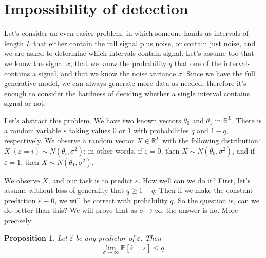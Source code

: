 \documentclass{article}
\newtheorem{prop}[thm]{Proposition}
\theoremstyle{thm}
\theoremstyle{definition}
\newcommand{\R}{\mathbb{R}}
\newcommand{\ep}{\varepsilon}
\newcommand{\1}{\mathbf{1}}
\renewcommand{\P}{\mathbb{P}}
\begin{document}






\section{Impossibility of detection}

Let's consider an even easier problem, in which someone hands us intervals of length $L$ that either contain the full signal plus noise, or contain just noise, and we are asked to determine which intervals contain signal. Let's assume too that we know the signal $x$, that we know the probability $q$ that one of the intervals contains a signal, and that we know the noise variance $\sigma$. Since we have the full generative model, we can always generate more data as needed; therefore it's enough to consider the hardness of deciding whether a single interval contains signal or not.

Let's abstract this problem. We have two known vectors $\theta_0$ and $\theta_1$ in $\R^L$. There is a random variable $\ep$ taking values 0 or 1 with probabilities $q$ and $1-q$, respectively. We observe a random vector $X \in \R^L$ with the following distribution: $X | (\ep = i) \sim N(\theta_i,\sigma^2)$; in other words, if $\ep = 0$, then $X \sim N(\theta_0,\sigma^2)$, and if $\ep = 1$, then $X \sim N(\theta_1,\sigma^2)$.

We observe $X$, and our task is to predict $\ep$. How well can we do it? First, let's assume without loss of generality that $q \ge 1-q$. Then if we make the constant prediction $\hat{\ep} \equiv 0$, we will be correct with probability $q$. So the question is, can we do better than this? We will prove that as $\sigma \to \infty$, the answer is no. More precisely:

\begin{prop}
Let $\hat{\ep}$ be any predictor of $\ep$. Then 
%
\begin{align}
%
\lim_{\sigma \to \infty} \P[ \hat{\ep} = \ep ] \le q.
%
\end{align}

\end{prop}
\end{document}
